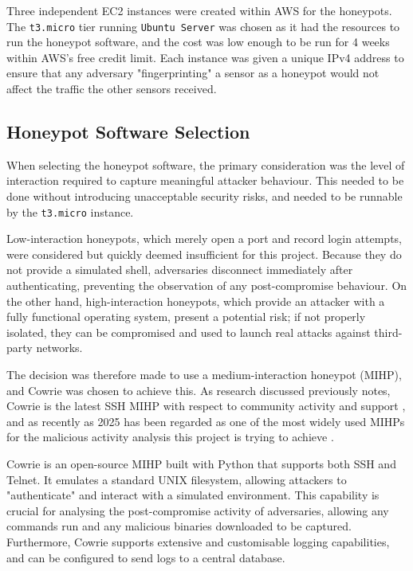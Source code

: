 \documentclass[]{article}
\begin{document}
Three independent EC2 instances were created within AWS for the honeypots. The \texttt{t3.micro} tier \cite{awst3} running \texttt{Ubuntu Server} was chosen as it had the resources to run the honeypot software, and the cost was low enough to be run for 4 weeks within AWS's free credit limit. Each instance was given a unique IPv4 address to ensure that any adversary "fingerprinting" a sensor as a honeypot would not affect the traffic the other sensors received.

\subsection{Honeypot Software Selection}

When selecting the honeypot software, the primary consideration was the level of interaction required to capture meaningful attacker behaviour. This needed to be done without introducing unacceptable security risks, and needed to be runnable by the \texttt{t3.micro} instance.

Low-interaction honeypots, which merely open a port and record login attempts, were considered but quickly deemed insufficient for this project. Because they do not provide a simulated shell, adversaries disconnect immediately after authenticating, preventing the observation of any post-compromise behaviour. On the other hand, high-interaction honeypots, which provide an attacker with a fully functional operating system, present a potential risk; if not properly isolated, they can be compromised and used to launch real attacks against third-party networks.

The decision was therefore made to use a medium-interaction honeypot (MIHP), and Cowrie \cite{cowrie} was chosen to achieve this. As research discussed previously notes, Cowrie is the latest SSH MIHP with respect to community activity and support \cite{fraunholz2017investigation}, and as recently as 2025 has been regarded as one of the most widely used MIHPs for the malicious activity analysis this project is trying to achieve \cite{munteanu2025attacks}. 

Cowrie is an open-source MIHP built with Python that supports both SSH and Telnet. It emulates a standard UNIX filesystem, allowing attackers to "authenticate" and interact with a simulated environment. This capability is crucial for analysing the post-compromise activity of adversaries, allowing any commands run and any malicious binaries downloaded to be captured. Furthermore, Cowrie supports extensive and customisable logging capabilities, and can be configured to send logs to a central database.
\end{document}
